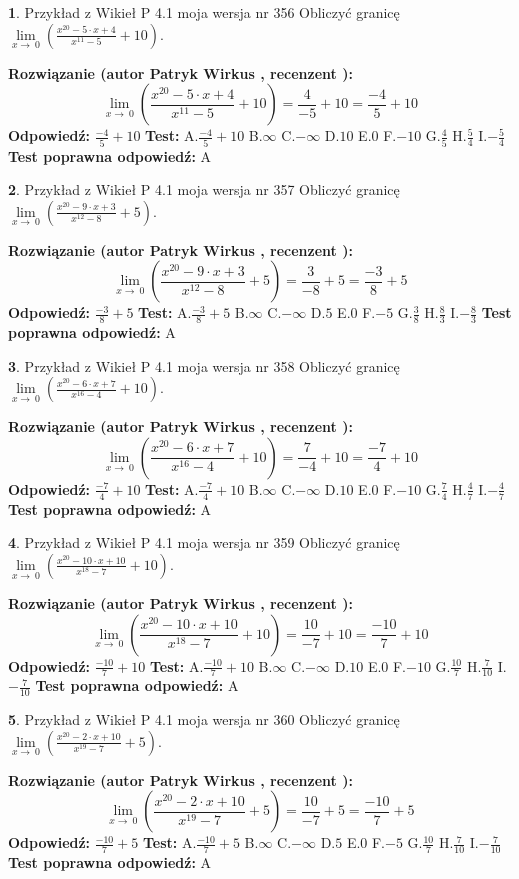 \documentclass[12pt, a4paper]{article}
\theoremstyle{definition} %
\newtheorem{zad}{}
\newcommand{\zadStart}[1]{\begin{zad}#1\newline}
\newcommand{\zadStop}{\end{zad}}
\newcommand{\rozwStart}[2]{\noindent \textbf{Rozwiązanie (autor #1 , recenzent #2): }\newline}
\newcommand{\rozwStop}{\newline}
\newcommand{\odpStart}{\noindent \textbf{Odpowiedź:}\newline}
\newcommand{\odpStop}{\newline}
\newcommand{\testStart}{\noindent \textbf{Test:}\newline}
\newcommand{\testStop}{\newline}
\newcommand{\kluczStart}{\noindent \textbf{Test poprawna odpowiedź:}\newline}
\newcommand{\kluczStop}{\newline}
\begin{document}
\zadStart{Przykład z Wikieł P 4.1 moja wersja nr 356}
Obliczyć granicę $\lim\limits_{x\to\ 0}(\frac{x^{20}-5 \cdot x +4}{x^{11}-5}+10)$.
\zadStop
\rozwStart{Patryk Wirkus}{}
$$\lim\limits_{x\to\ 0}(\frac{x^{20}-5 \cdot x +4}{x^{11}-5}+10)=\frac{4}{-5}+10=\frac{-4}{5}+10$$
\rozwStop
\odpStart
$\frac{-4}{5}+10$
\odpStop
\testStart
A.$\frac{-4}{5}+10$
B.$\infty$
C.$-\infty$
D.$10$
E.$0$
F.$-10$
G.$\frac{4}{5}$
H.$\frac{5}{4}$
I.$-\frac{5}{4}$
\testStop
\kluczStart
A
\kluczStop



\zadStart{Przykład z Wikieł P 4.1 moja wersja nr 357}
Obliczyć granicę $\lim\limits_{x\to\ 0}(\frac{x^{20}-9 \cdot x +3}{x^{12}-8}+5)$.
\zadStop
\rozwStart{Patryk Wirkus}{}
$$\lim\limits_{x\to\ 0}(\frac{x^{20}-9 \cdot x +3}{x^{12}-8}+5)=\frac{3}{-8}+5=\frac{-3}{8}+5$$
\rozwStop
\odpStart
$\frac{-3}{8}+5$
\odpStop
\testStart
A.$\frac{-3}{8}+5$
B.$\infty$
C.$-\infty$
D.$5$
E.$0$
F.$-5$
G.$\frac{3}{8}$
H.$\frac{8}{3}$
I.$-\frac{8}{3}$
\testStop
\kluczStart
A
\kluczStop



\zadStart{Przykład z Wikieł P 4.1 moja wersja nr 358}
Obliczyć granicę $\lim\limits_{x\to\ 0}(\frac{x^{20}-6 \cdot x +7}{x^{16}-4}+10)$.
\zadStop
\rozwStart{Patryk Wirkus}{}
$$\lim\limits_{x\to\ 0}(\frac{x^{20}-6 \cdot x +7}{x^{16}-4}+10)=\frac{7}{-4}+10=\frac{-7}{4}+10$$
\rozwStop
\odpStart
$\frac{-7}{4}+10$
\odpStop
\testStart
A.$\frac{-7}{4}+10$
B.$\infty$
C.$-\infty$
D.$10$
E.$0$
F.$-10$
G.$\frac{7}{4}$
H.$\frac{4}{7}$
I.$-\frac{4}{7}$
\testStop
\kluczStart
A
\kluczStop



\zadStart{Przykład z Wikieł P 4.1 moja wersja nr 359}
Obliczyć granicę $\lim\limits_{x\to\ 0}(\frac{x^{20}-10 \cdot x +10}{x^{18}-7}+10)$.
\zadStop
\rozwStart{Patryk Wirkus}{}
$$\lim\limits_{x\to\ 0}(\frac{x^{20}-10 \cdot x +10}{x^{18}-7}+10)=\frac{10}{-7}+10=\frac{-10}{7}+10$$
\rozwStop
\odpStart
$\frac{-10}{7}+10$
\odpStop
\testStart
A.$\frac{-10}{7}+10$
B.$\infty$
C.$-\infty$
D.$10$
E.$0$
F.$-10$
G.$\frac{10}{7}$
H.$\frac{7}{10}$
I.$-\frac{7}{10}$
\testStop
\kluczStart
A
\kluczStop



\zadStart{Przykład z Wikieł P 4.1 moja wersja nr 360}
Obliczyć granicę $\lim\limits_{x\to\ 0}(\frac{x^{20}-2 \cdot x +10}{x^{19}-7}+5)$.
\zadStop
\rozwStart{Patryk Wirkus}{}
$$\lim\limits_{x\to\ 0}(\frac{x^{20}-2 \cdot x +10}{x^{19}-7}+5)=\frac{10}{-7}+5=\frac{-10}{7}+5$$
\rozwStop
\odpStart
$\frac{-10}{7}+5$
\odpStop
\testStart
A.$\frac{-10}{7}+5$
B.$\infty$
C.$-\infty$
D.$5$
E.$0$
F.$-5$
G.$\frac{10}{7}$
H.$\frac{7}{10}$
I.$-\frac{7}{10}$
\testStop
\kluczStart
A
\kluczStop
\end{document}
